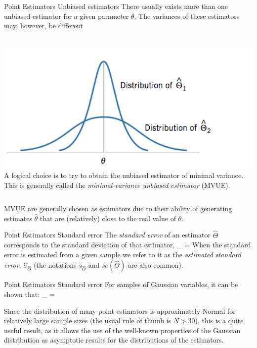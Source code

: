 \documentclass[t]{beamer}
\begin{document}
\begin{ftst}
{Point Estimators}
{Unbiased estimators}
There usually exists more than one unbiased estimator for a given parameter $\theta$. The variances of these estimators may, however, be different
\vone
\begin{columns}[T]
    \vspace{-1.5em} \includegraphics[width=1.2\textwidth]{../figs/ubes-var.png}
     A logical choice is to try to obtain the unbiased estimator of minimal variance. This is generally called the \textit{minimal-variance unbiased estimator} (MVUE).
\end{columns}
\vone
MVUE are generally chosen as estimators due to their ability of generating estimates $\hat{\theta}$ that are (relatively) close to the real value of $\theta$.
\end{ftst}


\begin{ftst}
{Point Estimators}
{Standard error}
The \textit{standard error} of an estimator $\hat{\Theta}$ corresponds to the standard deviation of that estimator,
\beqs
\sigma_{\hat{\Theta}} = 
\eqs
\vone
When the standard error is estimated from a given sample we refer to it as the \textit{estimated standard error},  $\hat{\sigma}_{\hat{\Theta}}$ (the notations $s_{\hat{\Theta}}$ and $se(\hat{\Theta})$ are also common).
\end{ftst}


\begin{ftst}
{Point Estimators}
{Standard error}
For samples of Gaussian variables, it can be shown that:
\beqs
\hat{\sigma}_{\hat{\Theta}} = 
\eqs

\vone
Since the distribution of many point estimators is approximately Normal for relatively large sample sizes (the usual rule of thumb is $N > 30$), this is a quite useful result, as it allows the use of the well-known properties of the Gaussian distribution as asymptotic results for the distributions of the estimators.
\end{ftst}
\end{document}
